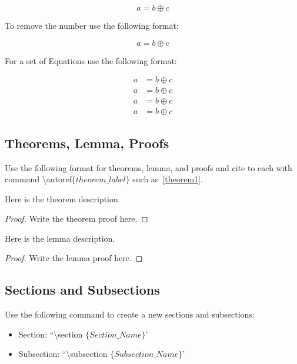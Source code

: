 \documentclass[Print]{../Style/isecure-v24}
\begin{document}
\begin{equation}
	a= b\oplus c
\end{equation}

To remove the number use the following format:

\begin{equation*}
	a= b\oplus c
\end{equation*}

For a set of Equations use the following format:

\begin{align*}
	a &= b\oplus c\\
	a &= b\oplus c\\
	a &= b\oplus c\\
	a &= b\oplus c
\end{align*}

\subsection{Theorems, Lemma, Proofs} \label{sec:theorems}

Use the following format for theorems, lemma, and proofs and cite to each with command \textbackslash autoref$\{theorem\_label\}$ such as~\autoref{theorem1}.


\begin{theorem} \label{theorem1}
	Here is the theorem description.
\end{theorem}
\begin{proof}
	Write the theorem proof here.
\end{proof}

\begin{lemma}
	Here is the lemma description.
\end{lemma}

\begin{proof}
	Write the lemma proof here.
\end{proof}

\subsection{Sections and Subsections}

Use the following command to create a new sections and subsections:

\begin{itemize}
	\item Section: ``\textbackslash section $\{Section\_Name\}$'
	\item Subsection: ``\textbackslash subsection $\{Subsection\_Name\}$'
\end{itemize}
\end{document}

